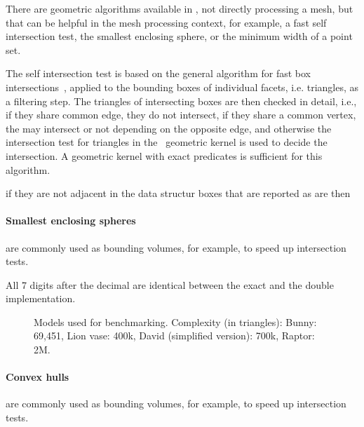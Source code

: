 
There are geometric algorithms available in \cgal, not directly
processing a mesh, but that can be helpful in the mesh processing
context, for example, a fast self intersection test, the smallest
enclosing sphere, or the minimum width of a point set.

The self intersection test is based on the general algorithm for fast
box intersections~\cite{cgal:ze-fsbi-02}, applied to the bounding
boxes of individual facets, i.e. triangles, as a filtering step. The
triangles of  intersecting boxes are then checked in detail, i.e., if
they share common edge, they do not intersect, if they share a common
vertex, the may intersect or not depending on the opposite edge, and
otherwise the intersection test for triangles in the \cgal\ geometric
kernel is used to decide the intersection. A geometric kernel with
exact predicates is sufficient for this algorithm. 

if they are not adjacent in the data structur
boxes that are reported as are then 

\paragraph{Smallest enclosing spheres} are commonly used as bounding
volumes, for example, to speed up intersection tests.

All 7 digits after the decimal are identical between the exact and the
double implementation.



\begin{figure}
  \centering
  \caption{Models used for benchmarking. 
           Complexity (in triangles):
           Bunny: 69,451,
           Lion vase: 400k,
           David (simplified version): 700k,
           Raptor: 2M.}
  \label{fig:models}
\end{figure}

\paragraph{Convex hulls} are commonly used as bounding
volumes, for example, to speed up intersection tests.

